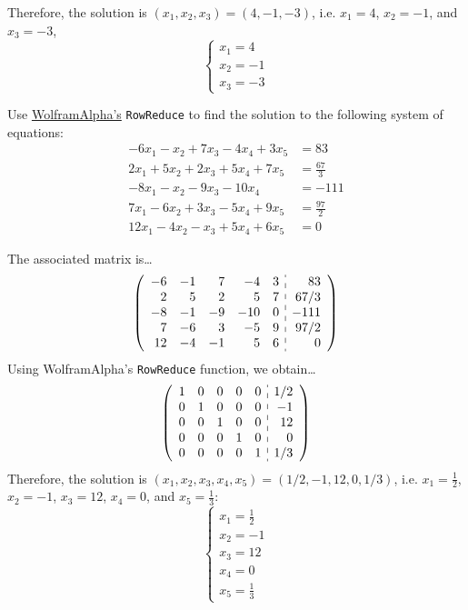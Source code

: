 \documentclass[11pt,letterpaper]{article}
\begin{document}
Therefore, the solution is $(x_1, x_2, x_3)= (4, -1, -3)$, i.e. $x_1= 4$, $x_2= -1$, and $x_3= -3$,
	\[
	\begin{cases}
	x_1= 4 \\
	x_2= -1 \\
	x_3= -3
	\end{cases}
	\]



\newpage





 Use \href{https://www.wolframalpha.com/}{WolframAlpha's} \texttt{RowReduce} to find the solution to the following system of equations: 
	\[
	\begin{aligned}
	-6x_1 - x_2 + 7x_3 - 4x_4 + 3x_5&= 83 \\
	2x_1 + 5x_2 + 2x_3 + 5x_4 + 7x_5&= \frac{67}{3} \\
	-8x_1 - x_2 - 9x_3 - 10x_4&= -111 \\
	7x_1 - 6x_2 + 3x_3 - 5x_4 + 9x_5&= \frac{97}{2} \\
	12x_1 - 4x_2 - x_3 + 5x_4 + 6x_5&= 0
	\end{aligned}
	\] \pspace

\sol The associated matrix is\dots
	\[
	\left(
	\begin{array}{rrrrr:r}
	-6 & -1 & 7 & -4 & 3 & 83 \\
	2 & 5 & 2 & 5 & 7 & 67/3 \\
	-8 & -1 & -9 & -10 & 0 & -111 \\
	7 & -6 & 3 & -5 & 9 & 97/2 \\
	12 & -4 & -1 & 5 & 6 & 0 
	\end{array} 
	\right)
	\] 
Using WolframAlpha's \texttt{RowReduce} function, we obtain\dots
	\[
	\left(
	\begin{array}{rrrrr:r}
	1 & 0 & 0 & 0 & 0 & 1/2 \\
	0 & 1 & 0 & 0 & 0 & -1 \\
	0 & 0 & 1 & 0 & 0 & 12 \\
	0 & 0 & 0 & 1 & 0 & 0 \\
	0 & 0 & 0 & 0 & 1 & 1/3
	\end{array} 
	\right)
	\] 
Therefore, the solution is $(x_1, x_2, x_3, x_4, x_5)= (1/2, -1, 12, 0, 1/3)$, i.e. $x_1= \frac{1}{2}$, $x_2= -1$, $x_3= 12$, $x_4= 0$, and $x_5= \frac{1}{3}$:
	\[
	\begin{cases}
	x_1= \frac{1}{2} \\
	x_2= -1 \\
	x_3= 12 \\
	x_4= 0 \\
	x_5= \frac{1}{3}
	\end{cases}
	\]
\end{document}
